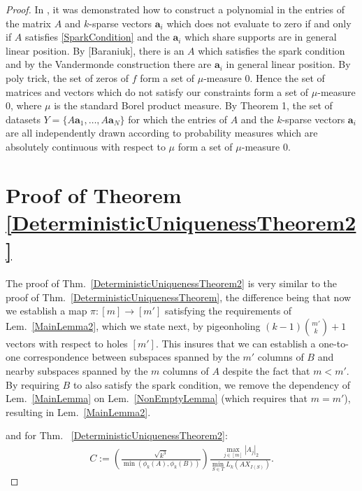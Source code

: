 \documentclass[journal, twocolumn]{IEEEtran}
\begin{document}
\begin{proof}
In \cite{Hillar15}, it was demonstrated how to construct a polynomial in the entries of the matrix $A$ and $k$-sparse vectors $\mathbf{a}_i$ which does not evaluate to zero if and only if $A$ satisfies \eqref{SparkCondition} and  the $\mathbf{a}_i$ which share supports are in general linear position. By [Baraniuk], there is an $A$ which satisfies the spark condition and by the Vandermonde construction there are $\mathbf{a}_i$ in general linear position. By poly trick, the set of zeros of $f$ form a set of $\mu$-measure 0. Hence the set of matrices and vectors which do not satisfy our constraints form a set of $\mu$-measure 0, where $\mu$ is the standard Borel product measure. By Theorem 1, the set of datasets $Y =  \{A\mathbf{a}_1, \ldots, A\mathbf{a}_N\}$ for which the entries of $A$ and the $k$-sparse vectors $\mathbf{a}_i$ are all independently drawn according to probability measures which are absolutely continuous with respect to $\mu$ form a set of $\mu$-measure 0. 

\section{Proof of Theorem \ref{DeterministicUniquenessTheorem2}}\label{mleqmAppendix}

The proof of Thm.~\ref{DeterministicUniquenessTheorem2} is very similar to the proof of Thm.~\ref{DeterministicUniquenessTheorem}, the difference being that now we establish a map $\pi: [m] \to [m']$ satisfying the requirements of Lem.~\ref{MainLemma2}, which we state next, by pigeonholing $(k-1){m' \choose k} + 1$ vectors with respect to holes $[m']$. This insures that we can establish a one-to-one correspondence between subspaces spanned by the $m'$ columns of $B$ and nearby subspaces spanned by the $m$ columns of $A$ despite the fact that $m < m'$. By requiring $B$ to also satisfy the spark condition, we remove the dependency of Lem.~\ref{MainLemma} on Lem.~\ref{NonEmptyLemma} (which requires that $m = m'$), resulting in Lem.~\ref{MainLemma2}.

and for Thm. ~\ref{DeterministicUniquenessTheorem2}:
\begin{align}\label{Cdef2}
C:= \left( \frac{ \sqrt{k^3}}{ \min(\phi_k(A), \phi_k(B)) } \right) \frac{\max_{j \in [m]} |A_j|_2}{\min_{S \in T} L_k(AX_{I(S)})}.
\end{align}



\end{proof}
\end{document}
